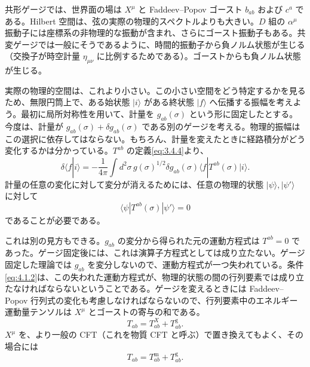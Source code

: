 \label{ch:4}

\label{sec:4.1}

共形ゲージでは、世界面の場は $X^\mu$ と Faddeev--Popov ゴースト $b_{ab}$ および $c^a$ である。Hilbert 空間は、弦の実際の物理的スペクトルよりも大きい。$D$ 組の $\alpha^\mu$ 振動子には座標系の非物理的な振動が含まれ、さらにゴースト振動子もある。共変ゲージでは一般にそうであるように、時間的振動子から負ノルム状態が生じる（交換子が時空計量 $\eta_{\mu\nu}$ に比例するためである）。ゴーストからも負ノルム状態が生じる。

実際の物理的空間は、これより小さい。この小さい空間をどう特定するかを見るため、無限円筒上で、ある始状態 $|i\rangle$ がある終状態 $|f\rangle$ へ伝播する振幅を考えよう。最初に局所対称性を用いて、計量を $g_{ab}(\sigma)$ という形に固定したとする。今度は、計量が $g_{ab}(\sigma)+\delta g_{ab}(\sigma)$ である別のゲージを考える。物理的振幅はこの選択に依存してはならない。もちろん、計量を変えたときに経路積分がどう変化するかは分かっている。$T^{ab}$ の定義\eqref{eq:3.4.4}より、
\begin{equation}
\delta\langle f|i\rangle
=-\frac1{4\pi}\int d^2\sigma\,g(\sigma)^{1/2}\delta g_{ab}(\sigma)
\langle f|T^{ab}(\sigma)|i\rangle .
\tag{4.1.1}\label{eq:4.1.1}
\end{equation}
計量の任意の変化に対して変分が消えるためには、任意の物理的状態 $|\psi\rangle,|\psi'\rangle$ に対して
\begin{equation}
\langle\psi|T^{ab}(\sigma)|\psi'\rangle=0
\tag{4.1.2}\label{eq:4.1.2}
\end{equation}
であることが必要である。

これは別の見方もできる。$g_{ab}$ の変分から得られた元の運動方程式は $T^{ab}=0$ であった。ゲージ固定後には、これは演算子方程式としては成り立たない。ゲージ固定した理論では $g_{ab}$ を変分しないので、運動方程式が一つ失われている。条件\eqref{eq:4.1.2}は、この失われた運動方程式が、物理的状態の間の行列要素では成り立たなければならないということである。ゲージを変えるときには Faddeev--Popov 行列式の変化も考慮しなければならないので、行列要素中のエネルギー運動量テンソルは $X^\mu$ とゴーストの寄与の和である。
\begin{equation}
T_{ab}=T^X_{ab}+T^{\mathrm g}_{ab}.
\tag{4.1.3}\label{eq:4.1.3}
\end{equation}
$X^\mu$ を、より一般の CFT（これを物質 CFT と呼ぶ）で置き換えてもよく、その場合には
\begin{equation}
T_{ab}=T^{\mathrm m}_{ab}+T^{\mathrm g}_{ab}.
\tag{4.1.4}\label{eq:4.1.4}
\end{equation}

